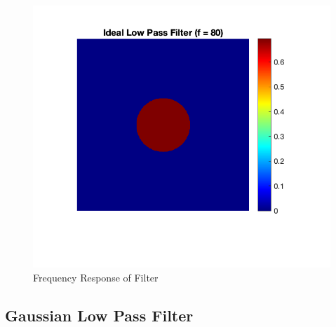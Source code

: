 \documentclass[12pt]{article}
\begin{document}
\begin{figure}[H]
    \centering
    \includegraphics{../images/ideal_LPF_80.png}
    \caption{Frequency Response of Filter}
\end{figure}

\subsection*{Gaussian Low Pass Filter}
\end{document}
